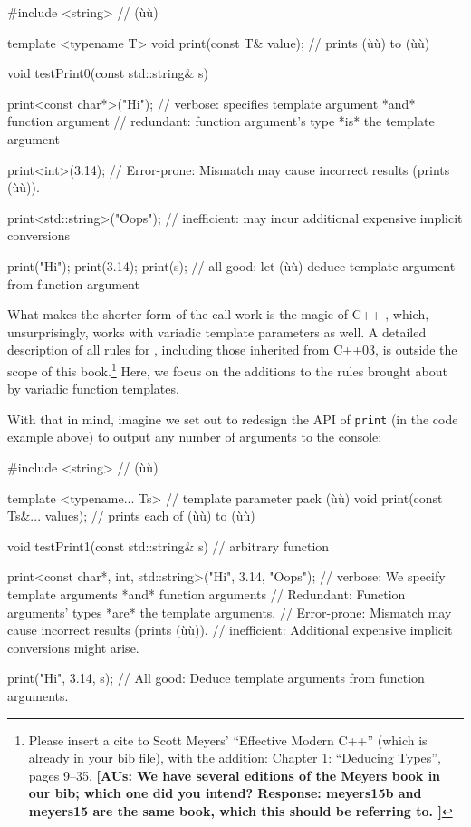 \begin{emcppslisting}
#include <string>  // (ù{}ù)

template <typename T> void print(const T& value);  // prints (ù{}ù) to (ù{}ù)

void testPrint0(const std::string& s)
{
    print<const char*>("Hi");
        // verbose:   specifies template argument *and* function argument
        // redundant: function argument's type *is* the template argument

    print<int>(3.14);
        // Error-prone: Mismatch may cause incorrect results (prints (ù{}ù)).

    print<std::string>("Oops");
        // inefficient: may incur additional expensive implicit conversions

    print("Hi");
    print(3.14);
    print(s);
        // all good: let (ù{}ù) deduce template argument from function argument
}
\end{emcppslisting}
    

\noindent What makes the shorter form of the call work is the magic of C++
, which, unsurprisingly, works with
variadic template parameters as well. A detailed description of all
rules for , including those
inherited from C++03, is outside the scope of this
book.\footnote{Please insert a cite to Scott Meyers'
``Effective Modern C++'' (which is already in your bib file), with the
addition: Chapter 1: ``Deducing Types'', pages 9--35. \textbf{[AUs: We have several editions of the Meyers book in our bib; which one did you intend?  Response: meyers15b and meyers15 are the same book, which this should be referring to.  ]}} Here, we focus on the additions to the
rules brought about by variadic function templates.

With that in mind, imagine we set out to redesign the API of
\lstinline!print! (in the code example above) to output any number of
arguments to the console:

\begin{emcppslisting}[emcppsbatch=e16]
#include <string>  // (ù{}ù)

template <typename... Ts>                // template parameter pack (ù{}ù)
void print(const Ts&... values);         // prints each of (ù{}ù) to (ù{}ù)

void testPrint1(const std::string& s)  // arbitrary function
{
    print<const char*, int, std::string>("Hi", 3.14, "Oops");
        // verbose:     We specify template arguments *and* function arguments
        // Redundant:   Function arguments' types *are* the template arguments.
        // Error-prone: Mismatch may cause incorrect results (prints (ù{}ù)).
        // inefficient: Additional expensive implicit conversions might arise.

    print("Hi", 3.14, s);
        // All good: Deduce template arguments from function arguments.
}
\end{emcppslisting}
    

